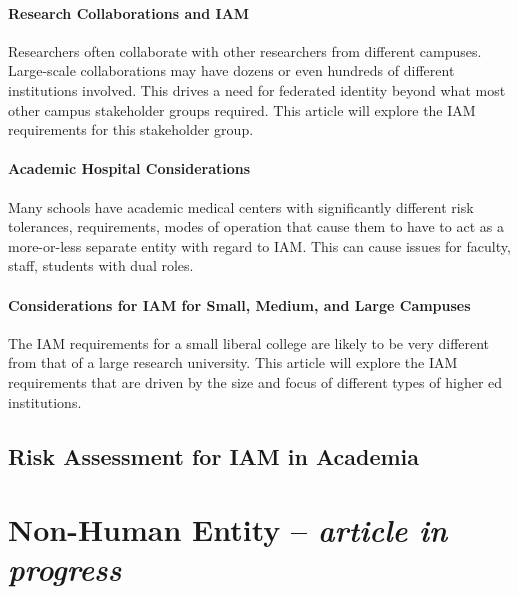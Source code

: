 \hypertarget{research-collaborations-and-iam}{%
\subsubsection{Research Collaborations and
IAM}\label{research-collaborations-and-iam}}

Researchers often collaborate with other researchers from different
campuses. Large-scale collaborations may have dozens or even hundreds of
different institutions involved. This drives a need for federated
identity beyond what most other campus stakeholder groups required. This
article will explore the IAM requirements for this stakeholder group.

\hypertarget{academic-hospital-considerations}{%
\subsubsection{Academic Hospital
Considerations}\label{academic-hospital-considerations}}

Many schools have academic medical centers with significantly different
risk tolerances, requirements, modes of operation that cause them to
have to act as a more-or-less separate entity with regard to IAM. This
can cause issues for faculty, staff, students with dual roles.

\hypertarget{considerations-for-iam-for-small-medium-and-large-campuses}{%
\subsubsection{Considerations for IAM for Small, Medium, and Large
Campuses}\label{considerations-for-iam-for-small-medium-and-large-campuses}}

The IAM requirements for a small liberal college are likely to be very
different from that of a large research university. This article will
explore the IAM requirements that are driven by the size and focus of
different types of higher ed institutions.

\hypertarget{risk-assessment-for-iam-in-academia}{%
\section{Risk Assessment for IAM in
Academia}\label{risk-assessment-for-iam-in-academia}}

\hypertarget{non-human-entity-article-in-progress}{%
\chapter{\texorpdfstring{Non-Human Entity -- \emph{article in
progress}}{Non-Human Entity -- article in progress}}\label{non-human-entity-article-in-progress}}


